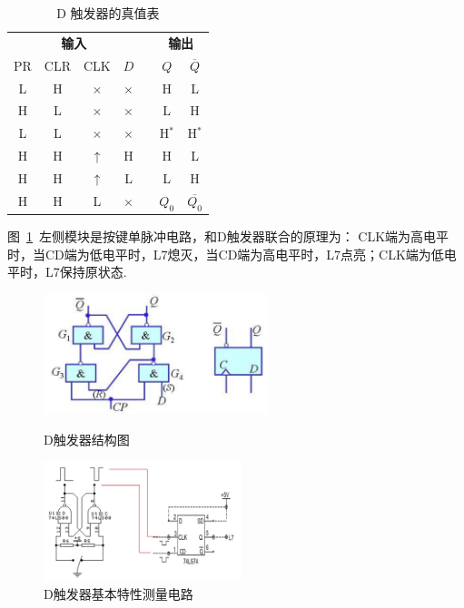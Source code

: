 \documentclass[11pt]{SEU-Digital-Report}
\begin{document}
            \begin{table}[htbp]
                \centering
                \caption{D 触发器的真值表}
                \begin{tabular}{ccccccc}
                    \toprule
                    \multicolumn{4}{c}{\textbf{输入}} && \multicolumn{2}{c}{\textbf{输出}} \\
                    \cmidrule{1-4}\cmidrule{6-7}
                    PR & CLR & CLK & $D$ && $Q$ & $\overline{Q}$ \\
                    \hline\hline
                    L & H & $\times$ & $\times$ && H & L \\
                    H & L & $\times$ & $\times$ && L & H \\
                    L & L & $\times$ & $\times$ && H$^*$ & H$^*$ \\
                    H & H & $\uparrow$ & H && H & L \\
                    H & H & $\uparrow$ & L && L & H \\
                    H & H & L & $\times$ && $Q_0$ & $\overline{Q_0}$ \\
                    \bottomrule
                \end{tabular}%
                \label{tab:D_truth_table}%
            \end{table}%

            图~\ref{fig:D_test}~左侧模块是按键单脉冲电路，和D触发器联合的原理为：
            CLK端为高电平时，当CD端为低电平时，L7熄灭，当CD端为高电平时，L7点亮；CLK端为低电平时，L7保持原状态.

            \begin{figure}[htbp]
                \centering
                \begin{minipage}{0.4\linewidth}
                    \includegraphics[height=3.5cm]{fig/D_flip_flop.png}
                    \caption{D触发器结构图}
                    \label{fig:D_flip_flop}
                \end{minipage}
                \quad
                \begin{minipage}{0.4\linewidth}
                    \includegraphics[height=3.5cm]{fig/D_test.png}
                    \caption{D触发器基本特性测量电路}
                    \label{fig:D_test}
                \end{minipage}
            \end{figure}
\end{document}
